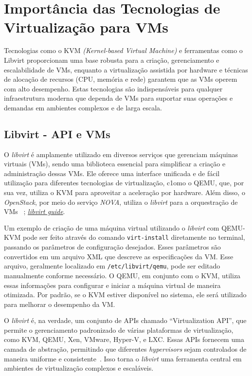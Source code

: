\section{Importância das Tecnologias de Virtualização para VMs}

Tecnologias como o KVM \textit{(Kernel-based Virtual Machine)} e ferramentas como o Libvirt proporcionam uma base robusta para a criação, gerenciamento e escalabilidade de VMs, enquanto a virtualização assistida por hardware e técnicas de alocação de recursos (CPU, memória e rede) garantem que as VMs operem com alto desempenho. Estas tecnologias são indispensáveis para qualquer infraestrutura moderna que dependa de VMs para suportar suas operações e demandas em ambientes complexos e de larga escala.

\subsection{Libvirt - API e VMs}
O \textit{libvirt} é amplamente utilizado em diversos serviços que gerenciam máquinas virtuais (VMs), sendo uma biblioteca essencial para simplificar a criação e administração dessas VMs. Ele oferece uma interface unificada e de fácil utilização para diferentes tecnologias de virtualização, c1omo o QEMU, que, por sua vez, utiliza o KVM para aproveitar a aceleração por hardware. Além disso, o \textit{OpenStack}, por meio do serviço \textit{NOVA}, utiliza o \textit{libvirt} para a orquestração de VMs ~\citep{DocumentacaoOpenstack}; \href{https://docs.openstack.org/kolla-ansible/latest/reference/compute/libvirt-guide.html}{\textit{libvirt guide}}.

Um exemplo de criação de uma máquina virtual utilizando o \textit{libvirt} com QEMU-KVM pode ser feito através do comando \texttt{virt-install} diretamente no terminal, passando os parâmetros de configuração desejados. Esses parâmetros são convertidos em um arquivo XML que descreve as especificações da VM. Esse arquivo, geralmente localizado em \texttt{/etc/libvirt/qemu}, pode ser editado manualmente conforme necessário. O QEMU, em conjunto com o KVM, utiliza essas informações para configurar e iniciar a máquina virtual de maneira otimizada. Por padrão, se o KVM estiver disponível no sistema, ele será utilizado para melhorar o desempenho da VM.

O \textit{libvirt} é, na verdade, um conjunto de APIs chamado ``Virtualization API'', que permite o gerenciamento padronizado de várias plataformas de virtualização, como KVM, QEMU, Xen, VMware, Hyper-V, e LXC. Essas APIs fornecem uma camada de abstração, permitindo que diferentes \textit{hypervisors} sejam controlados de maneira uniforme e consistente~\citep{chirammal2016mastering}. Isso torna o \textit{libvirt} uma ferramenta central em ambientes de virtualização complexos e escaláveis.

